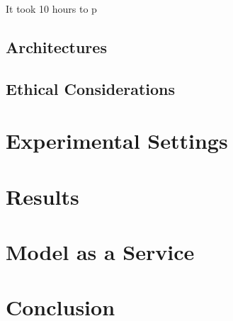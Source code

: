 \documentclass{UoYCSproject}
\begin{document}
    It took 10 hours to p


\section{Architectures}\label{sec:architectures}

\section{Ethical Considerations}\label{sec:ethical-considerations}

\chapter{Experimental Settings}
\label{ch:experimental-settings}

\chapter{Results}
\label{ch:results}

\chapter{Model as a Service}
\label{ch:model-as-a-service}

\chapter{Conclusion}
\label{ch:conclusion}

\printbibliography
\end{document}
